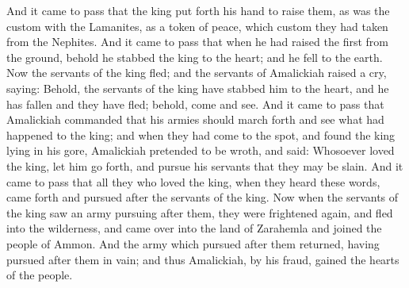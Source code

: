 And it came to pass that the king put forth his hand to raise them, as was the custom with the Lamanites, as a token of peace, which custom they had taken from the Nephites.
\bverse \iffalse And it came to pass that when he had raised the first from the ground, behold he stabbed the king to the heart; and he fell to the earth. \fi
And it came to pass that when he had raised the first from the ground, behold he stabbed the king to the heart; and he fell to the earth.
\bverse \iffalse Now the servants of the king fled; and the servants of Amalickiah raised a cry, saying: \fi
Now the servants of the king fled; and the servants of Amalickiah raised a cry, saying:
\bverse \iffalse Behold, the servants of the king have stabbed him to the heart, and he has fallen and they have fled; behold, come and see. \fi
Behold, the servants of the king have stabbed him to the heart, and he has fallen and they have fled; behold, come and see.
\bverse \iffalse And it came to pass that Amalickiah commanded that his armies should march forth and see what had happened to the king; and when they had come to the spot, and found the king lying in his gore, Amalickiah pretended to be wroth, and said: Whosoever loved the king, let him go forth, and pursue his servants that they may be slain. \fi
And it came to pass that Amalickiah commanded that his armies should march forth and see what had happened to the king; and when they had come to the spot, and found the king lying in his gore, Amalickiah pretended to be wroth, and said: Whosoever loved the king, let him go forth, and pursue his servants that they may be slain.
\bverse \iffalse And it came to pass that all they who loved the king, when they heard these words, came forth and pursued after the servants of the king. \fi
And it came to pass that all they who loved the king, when they heard these words, came forth and pursued after the servants of the king.
\bverse \iffalse Now when the servants of the king saw an army pursuing after them, they were frightened again, and fled into the wilderness, and came over into the land of Zarahemla and joined the people of Ammon. \fi
Now when the servants of the king saw an army pursuing after them, they were frightened again, and fled into the wilderness, and came over into the land of Zarahemla and joined the people of Ammon.
\bverse \iffalse And the army which pursued after them returned, having pursued after them in vain; and thus Amalickiah, by his fraud, gained the hearts of the people. \fi
And the army which pursued after them returned, having pursued after them in vain; and thus Amalickiah, by his fraud, gained the hearts of the people.

